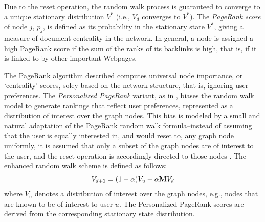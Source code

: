 \documentclass[11pt,oneside]{book}
\newcommand{\transition}{{\bf M}}
\begin{document}

Due to the reset operation, the random walk process is guaranteed to
converge to a unique stationary distribution $V^*$ (i.e., $V_d$
converges to $V^*$). The {\it PageRank score} of node $j$, $p_j$, is
defined as its probability in the stationary state $V^*$, giving a
measure of document centrality in the network. In general, a node is
assigned a high PageRank score if the sum of the ranks of its
backlinks is high, that is, if it is linked to by other important
Webpages.


The PageRank algorithm described computes universal node importance,
or `centrality' scores, soley based on the network structure, that is,
ignoring user preferences. The {\it Personalized PageRank} variant, as in
\citep{richardson2001intelligent}, biases the random walk model to
generate rankings that reflect user preferences, represented as a
distribution of interest over the graph nodes. This bias is modeled by
a small and natural adaptation of the PageRank random walk
formula--instead of assuming that the user is equally interested in,
and would reset to, any graph node uniformly, it is assumed that only
a subset of the graph nodes are of interest to the user, and the reset
operation is accordingly directed to those nodes . The enhanced random
walk scheme is defined as follows:
\begin{equation}
V_{d+1} = (1-\alpha) V_u + \alpha \transition V_d
\label{eq:ppr}
\end{equation}
where $V_u$ denotes a distribution of interest over the graph nodes,
e.g., nodes that are known to be of interest to user $u$.  The
Personalized PageRank scores are derived from the corresponding
stationary state distribution. 
\end{document}
